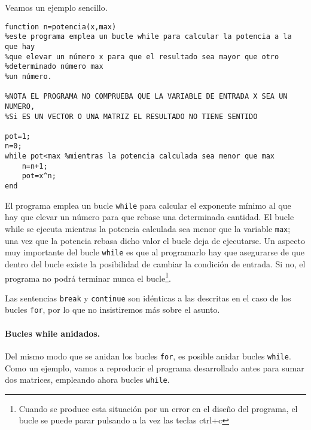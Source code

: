 Veamos un ejemplo sencillo. 

\begin{verbatim}
function n=potencia(x,max)
%este programa emplea un bucle while para calcular la potencia a la que hay
%que elevar un número x para que el resultado sea mayor que otro
%determinado número max
%un número.

%NOTA EL PROGRAMA NO COMPRUEBA QUE LA VARIABLE DE ENTRADA X SEA UN NUMERO,
%Si ES UN VECTOR O UNA MATRIZ EL RESULTADO NO TIENE SENTIDO
  
pot=1;
n=0;
while pot<max %mientras la potencia calculada sea menor que max
    n=n+1;
    pot=x^n;
end
\end{verbatim}

El programa emplea un bucle \texttt{while} para calcular el exponente mínimo al que hay que elevar un número para que rebase una determinada cantidad. El bucle while se ejecuta mientras la potencia calculada sea menor que la variable \texttt{max}; una vez que la potencia rebasa dicho valor el bucle deja de ejecutarse. Un aspecto muy importante del bucle \texttt{while} es que al programarlo hay que asegurarse de que dentro del bucle existe la posibilidad de cambiar la condición de entrada. Si no, el programa no podrá terminar nunca el bucle\footnote{Cuando se produce esta situación por un error en el diseño del programa, el bucle se puede parar pulsando a la vez las teclas ctrl+c}.

Las sentencias \texttt{break} y \texttt{continue} son idénticas a las descritas en el caso de los bucles \texttt{for}, por lo que no insistiremos más sobre el asunto.

\paragraph{Bucles while anidados.}  Del mismo modo que se anidan los bucles \texttt{for}, es posible anidar bucles \texttt{while}. Como un ejemplo, vamos a reproducir el programa desarrollado antes para sumar dos matrices, empleando ahora bucles \texttt{while}.

